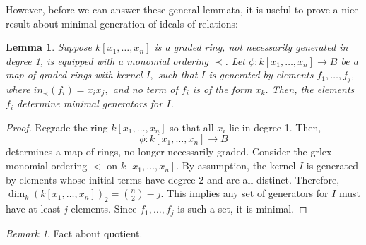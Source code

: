 \documentclass{amsart}
\theoremstyle{plain}
\newtheorem{lem}[thm]{Lemma}
\theoremstyle{definition}
\theoremstyle{remark}
\newtheorem{rem}[thm]{Remark}
\numberwithin{equation}{section}
\begin{document}
However, before we can answer these general lemmata, it is useful to prove a nice result about minimal generation of ideals of relations:
\begin{lem}
\label{lem:minimal_quadratic}
Suppose $k[x_1,\ldots, x_n]$ is a graded ring, not necessarily
generated in degree 1, is equipped with a monomial ordering $\prec$.
 Let $\phi:k[x_1,\ldots, x_n] \rightarrow B$ be a map of graded
rings with kernel $I,$ such that $I$ is generated by elements $f_1,
\ldots, f_j$, where $in_\prec(f_i) = x_ix_j,$ and no term of $f_i$
is of the form $x_k$. Then, the elements $f_i$ determine minimal
generators for $I$.
\end{lem}
\begin{proof}
Regrade the ring $k[x_1, \ldots, x_n]$ so that all $x_i$ lie in
degree 1. Then,
\[
	\phi : k[x_1, \ldots, x_n] \rightarrow B
\]
\noindent
determines a map of rings, no longer necessarily graded. Consider
the grlex monomial ordering $<$ on $k[x_1, \ldots, x_n]$.
By
assumption, the kernel $I$ is generated by elements whose initial
terms have degree 2 and are all distinct. Therefore, $\dim_k (k[x_1,
\ldots, x_n])_2 = \binom{n}{2}-j.$ This implies any set of
generators for $I$ must have at least $j$ elements. Since $f_1,
\ldots, f_j$ is such a set, it is minimal.
\end{proof}

\begin{rem}
Fact about quotient.
\end{rem}
\end{document}
